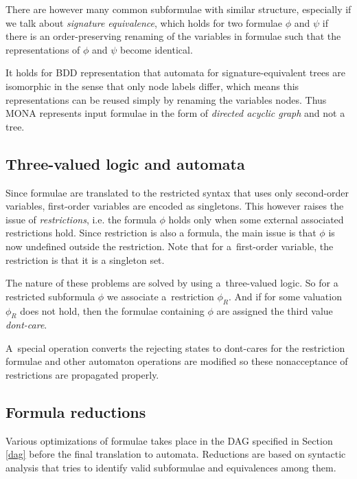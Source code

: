 There are however many common subformulae with similar structure, especially if
we talk about \emph{signature equivalence}, which holds for two formulae $\phi$
and $\psi$ if there is an order-preserving renaming of the variables in formulae
such that the representations of $\phi$ and $\psi$ become identical.

It holds for BDD representation that automata for signature-equivalent trees are
isomorphic in the sense that only node labels differ, which means this
representations can be reused simply by renaming the variables nodes. Thus MONA
represents input formulae in the form of \emph{directed acyclic graph} and not a
tree.
\newpage
\subsection{Three-valued logic and automata}
Since formulae are translated to the restricted syntax that uses only
second-order variables, first-order variables are encoded as singletons. This
however raises the issue of \emph{restrictions}, i.e. the formula $\phi$ holds
only when some external associated restrictions hold. Since restriction is also
a formula, the main issue is that $\phi$ is now undefined outside the
restriction. Note that for a~first-order variable, the restriction is that it is
a singleton set.

The nature of these problems are solved by using a~three-valued logic. So for a
restricted subformula $\phi$ we associate a~restriction $\phi_R$. And if for
some valuation $\phi_R$ does not hold, then the formulae containing $\phi$ are
assigned the third value \emph{dont-care}.

A~special operation converts the rejecting states to dont-cares for the
restriction formulae and other automaton operations are modified so these
nonacceptance of restrictions are propagated properly.

\subsection{Formula reductions}
Various optimizations of formulae takes place in the DAG specified in Section
\ref{dag} before the final translation to automata. Reductions are based on
syntactic analysis that tries to identify valid subformulae and equivalences
among them.

